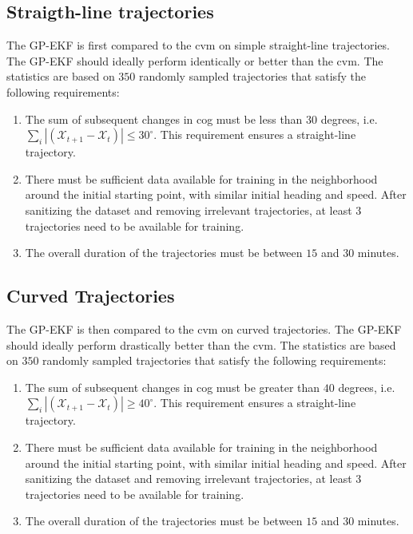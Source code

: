 \subsection{Straigth-line trajectories}
The GP-EKF is first compared to the \acrshort{cvm} on simple straight-line trajectories. The GP-EKF should ideally perform identically or better than the \acrshort{cvm}.
The statistics are based on $350$ randomly sampled trajectories that satisfy the following requirements:
\begin{enumerate}
    \item The sum of subsequent changes in \acrshort{cog} must be less than $30$ degrees, i.e. $\sum_i |(\mathcal{X}_{t+1} - \mathcal{X}_t)| \leq 30^\circ$. This requirement ensures a straight-line trajectory.
    \item There must be sufficient data available for training in the neighborhood around the initial starting point, with similar initial heading and speed. After sanitizing the dataset and removing irrelevant trajectories, at least $3$ trajectories need to be available for training.
    \item The overall duration of the trajectories must be between $15$ and $30$ minutes.
\end{enumerate}




\subsection{Curved Trajectories}
The GP-EKF is then compared to the \acrshort{cvm} on curved trajectories. The GP-EKF should ideally perform drastically better than the \acrshort{cvm}.
The statistics are based on $350$ randomly sampled trajectories that satisfy the following requirements:
\begin{enumerate}
    \item The sum of subsequent changes in \acrshort{cog} must be greater than $40$ degrees, i.e. $\sum_i |(\mathcal{X}_{t+1} - \mathcal{X}_t)| \geq 40^\circ$. This requirement ensures a straight-line trajectory.
    \item There must be sufficient data available for training in the neighborhood around the initial starting point, with similar initial heading and speed. After sanitizing the dataset and removing irrelevant trajectories, at least $3$ trajectories need to be available for training.
    \item The overall duration of the trajectories must be between $15$ and $30$ minutes.
\end{enumerate}

